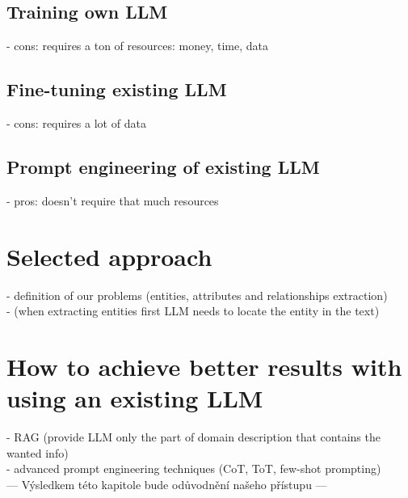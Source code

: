 \subsection*{Training own LLM}
- cons: requires a ton of resources: money, time, data


\subsection*{Fine-tuning existing LLM}
- cons: requires a lot of data


\subsection*{Prompt engineering of existing LLM}
- pros: doesn't require that much resources


\section*{Selected approach}

- definition of our problems (entities, attributes and relationships extraction) \\
- (when extracting entities first LLM needs to locate the entity in the text) \\

\section*{How to achieve better results with using an existing LLM}
- RAG (provide LLM only the part of domain description that contains the wanted info) \\
- advanced prompt engineering techniques (CoT, ToT, few-shot prompting) \\



--- Výsledkem této kapitole bude odůvodnění našeho přístupu ---